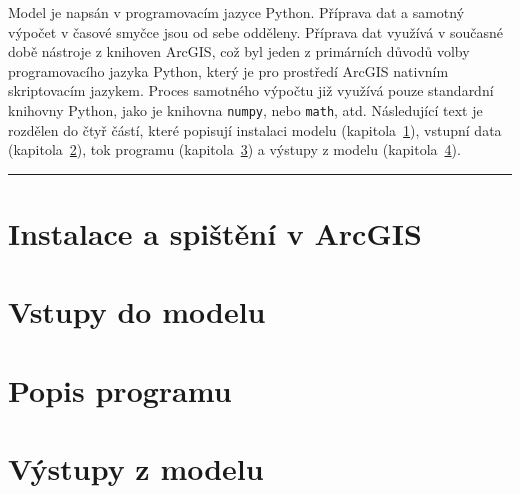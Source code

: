 Model \smod je napsán v programovacím jazyce Python. Příprava dat a samotný výpočet v časové smyčce jsou od sebe odděleny. Příprava dat využívá v současné době nástroje z knihoven ArcGIS, což byl jeden z primárních důvodů volby  programovacího jazyka Python, který je pro prostředí ArcGIS nativním skriptovacím jazykem. Proces samotného výpočtu již využívá pouze standardní knihovny Python, jako je knihovna \texttt{numpy}, nebo \texttt{math}, atd. Následující text je rozdělen do čtyř částí, které popisují instalaci modelu (kapitola~\ref{kap:instalace}), vstupní data (kapitola~\ref{kap:vstupy}), tok programu (kapitola~\ref{kap:tok}) a výstupy z modelu (kapitola~\ref{kap:vystupy}). \\
% 
% 
\rule{\textwidth}{0.3pt}

%         


	\section{Instalace \smod a spištění v ArcGIS} \label{kap:instalace}
	 
	
	
	\section{Vstupy do modelu} \label{kap:vstupy}
	 
	
	\section{Popis programu} \label{kap:tok}
	
	
	\newpage
	\section{Výstupy z modelu} \label{kap:vystupy}
	

